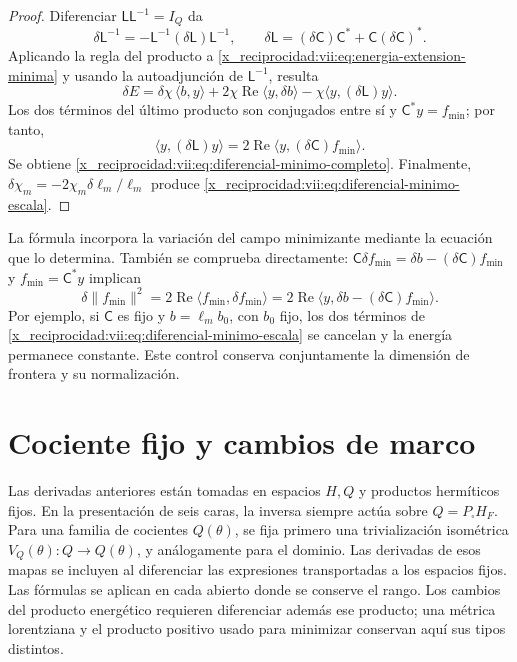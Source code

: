 \begin{proof}
Diferenciar \(\mathsf L\mathsf L^{-1}=I_Q\) da
\[
 \delta\mathsf L^{-1}
 =-\mathsf L^{-1}(\delta\mathsf L)\mathsf L^{-1},\qquad
 \delta\mathsf L=(\delta\mathsf C)\mathsf C^*
                      +\mathsf C(\delta\mathsf C)^*.
\]
Aplicando la regla del producto a \eqref{x_reciprocidad:vii:eq:energia-extension-minima}
y usando la autoadjunción de \(\mathsf L^{-1}\), resulta
\[
 \delta E=\delta\chi\,\langle b,y\rangle
 +2\chi\operatorname{Re}\langle y,\delta b\rangle
 -\chi\langle y,(\delta\mathsf L)y\rangle.
\]
Los dos términos del último producto son conjugados entre sí y
\(\mathsf C^*y=f_{\min}\); por tanto,
\[
 \langle y,(\delta\mathsf L)y\rangle
 =2\operatorname{Re}\langle y,(\delta\mathsf C)f_{\min}\rangle.
\]
Se obtiene \eqref{x_reciprocidad:vii:eq:diferencial-minimo-completo}.
Finalmente, \(\delta\chi_m=-2\chi_m\delta\ell_m/\ell_m\)
produce \eqref{x_reciprocidad:vii:eq:diferencial-minimo-escala}.
\end{proof}

La fórmula incorpora la variación del campo minimizante mediante la
ecuación que lo determina. También se comprueba directamente:
\(\mathsf C\delta f_{\min}=\delta b-(\delta\mathsf C)f_{\min}\)
y \(f_{\min}=\mathsf C^*y\) implican
\[
 \delta\|f_{\min}\|^2
 =2\operatorname{Re}\langle f_{\min},\delta f_{\min}\rangle
 =2\operatorname{Re}
     \langle y,\delta b-(\delta\mathsf C)f_{\min}\rangle.
\]
Por ejemplo, si \(\mathsf C\) es fijo y \(b=\ell_m b_0\), con
\(b_0\) fijo, los dos términos de
\eqref{x_reciprocidad:vii:eq:diferencial-minimo-escala} se cancelan y la energía
permanece constante. Este control conserva conjuntamente la dimensión
de frontera y su normalización.

\section{Cociente fijo y cambios de marco}
\label{x_reciprocidad:vii:subsec:marcos-minimo}

Las derivadas anteriores están tomadas en espacios \(H,Q\) y productos
hermíticos fijos. En la presentación de seis caras, la inversa siempre
actúa sobre \(Q=P_\square H_F\). Para una familia de cocientes
\(Q(\theta)\), se fija primero una trivialización isométrica
\(V_Q(\theta):Q\to Q(\theta)\), y análogamente para el dominio.
Las derivadas de esos mapas se incluyen al diferenciar las expresiones
transportadas a los espacios fijos. Las fórmulas se aplican en cada
abierto donde se conserve el rango. Los cambios del producto energético
requieren diferenciar además ese producto; una métrica lorentziana
y el producto positivo usado para minimizar conservan aquí sus tipos
distintos.


